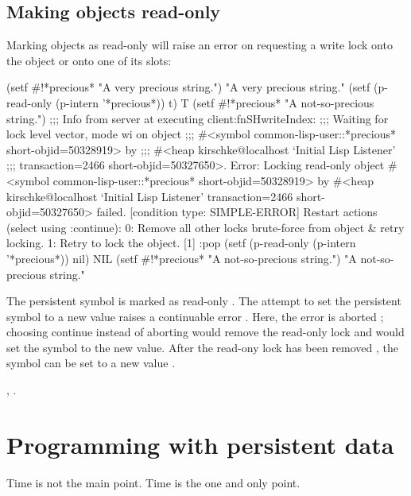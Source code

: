 \subsection{Making objects read-only}

Marking objects as read-only will raise an error on requesting a write
lock onto the object or onto one of its slots:
\begin{CompactCode}
\listener{}(setf #!*precious* "A very precious string.")
"A very precious string."
\listener{}(setf (p-read-only (p-intern '*precious*)) t)\marginnumber{\smalloi}
T
\listener{}(setf #!*precious* "A not-so-precious string.")\marginnumber{\smalloii}
;;; Info from server at executing client:fnSHwriteIndex:
;;; Waiting for lock level vector, mode wi on object
;;; #<symbol common-lisp-user::*precious* short-objid=50328919> by
;;; #<heap kirschke@localhost `Initial Lisp Listener'
;;;        transaction=2466 short-objid=50327650>.
Error: Locking read-only object #<symbol common-lisp-user::*precious*
       short-objid=50328919> by #<heap kirschke@localhost `Initial
       Lisp Listener' transaction=2466 short-objid=50327650> failed.
  [condition type: SIMPLE-ERROR]
Restart actions (select using :continue):
 0: Remove all other locks brute-force from object & retry locking.
 1: Retry to lock the object.
[1] \listener{}:pop\marginnumber{\smalloiii}
\listener{}(setf (p-read-only (p-intern '*precious*)) nil)\marginnumber{\smalloiv}
NIL
\listener{}(setf #!*precious* "A not-so-precious string.")\marginnumber{\smallov}
"A not-so-precious string."
\end{CompactCode}

The persistent symbol is marked as read-only \oi. The attempt to set
the persistent symbol to a new value raises a continuable error \oii.
Here, the error is aborted \oiii; choosing continue instead of
aborting would remove the read-only lock and would set the symbol to
the new value. After the read-ony lock has been removed \oiv, the
symbol can be set to a new value \ov.

 {},
.

\section{Programming with persistent data}
%
\begin{fortune}%
Time is not the main point. Time is the one and only point.
\end{fortune}%

